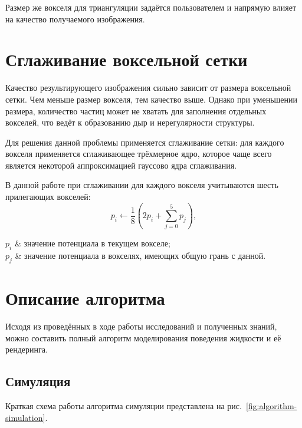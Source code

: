 Размер же вокселя для триангуляции задаётся пользователем и напрямую влияет на качество получаемого изображения.


\section{Сглаживание воксельной сетки}
Качество результирующего изображения сильно зависит от размера воксельной сетки. Чем меньше размер вокселя, тем качество выше. Однако при уменьшении размера, количество частиц может не хватать для заполнения отдельных вокселей, что ведёт к образованию дыр и нерегулярности структуры.

Для решения данной проблемы применяется сглаживание сетки: для каждого вокселя применяется сглаживающее трёхмерное ядро, которое чаще всего является некоторой аппроксимацией гауссово ядра сглаживания.

В данной работе при сглаживании для каждого вокселя учитываются шесть прилегающих вокселей:
\begin{equation} \label{eq:spreading}
  p_i\gets \frac{1}{8}\left(2p_i+\sum_{j=0}^5p_j\right),
\end{equation}
\begin{conditions}
  $p_i$ & значение потенциала в текущем вокселе;\\
  $p_j$ & значение потенциала в вокселях, имеющих общую грань с данной.
\end{conditions}


\section{Описание алгоритма}
Исходя из проведённых в ходе работы исследований и полученных знаний, можно составить полный алгоритм моделирования поведения жидкости и её рендеринга.


\subsection{Симуляция}
Краткая схема работы алгоритма симуляции представлена на рис.~\ref{fig:algorithm-simulation}.

